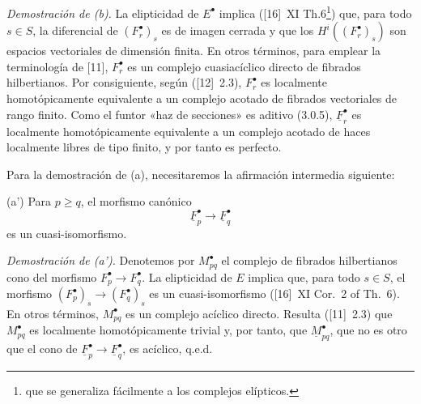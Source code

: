 \emph{Demostración de (b).} La elipticidad de $E^\bullet$ implica ([16]~XI Th.6\footnote{que se generaliza fácilmente a los complejos elípticos.}) que, para todo $s\in S$, la diferencial de $(F_r^\bullet)_s$ es de imagen cerrada y que los $H^i((F_r^\bullet)_s)$ son espacios vectoriales de dimensión finita. En otros términos, para emplear la terminología de [11], $F_r^\bullet$ es un complejo cuasiacíclico directo de fibrados hilbertianos. Por consiguiente, según ([12]~2.3), $F_r^\bullet$ es localmente homotópicamente equivalente a un complejo acotado de fibrados vectoriales de rango finito. Como el funtor «haz de secciones» es aditivo (3.0.5), $\underline F_r^\bullet$ es localmente homotópicamente equivalente a un complejo acotado de haces localmente libres de tipo finito, y por tanto es perfecto.

Para la demostración de (a), necesitaremos la afirmación intermedia siguiente:

(a') Para $p\geq q$, el morfismo canónico
\[
 \underline F_p^\bullet\longrightarrow \underline F_q^\bullet
\]
es un cuasi-isomorfismo.

\emph{Demostración de (a').} Denotemos por $M_{pq}^\bullet$ el complejo de fibrados hilbertianos cono del morfismo $F_p^\bullet\longrightarrow F_q^\bullet$. La elipticidad de $E$ implica que, para todo $s\in S$, el morfismo $(F_p^\bullet)_s\longrightarrow (F_q^\bullet)_s$ es un cuasi-isomorfismo ([16]~XI Cor.~2 of Th.~6). En otros términos, $M_{pq}^\bullet$ es un complejo acíclico directo. Resulta ([11]~2.3) que $M_{pq}^\bullet$ es localmente homotópicamente trivial y, por tanto, que $\underline M_{pq}^\bullet$, que no es otro que el cono de $\underline F_p^\bullet\longrightarrow\underline F_q^\bullet$, es acíclico, q.e.d.
